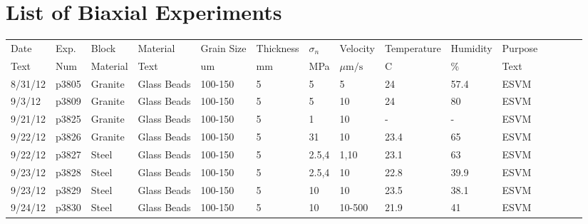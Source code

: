 \chapter{List of Biaxial Experiments}

\setlength\LTleft{0pt}
\setlength\LTright{0pt}
\begin{landscape}
\tiny
\begin{longtable} {lllllllllllllll}
Date     & Exp. & Block            & Material     & Grain Size   & Thickness & $\sigma_n$ & Velocity                     & Temperature & Humidity & Purpose\\
Text     & Num        & Material         & Text         & um           & mm        & MPa           & $\mu\text{m/s}$                         & C           & \%       & Text \\
\hline
\hline
8/31/12  & p3805      & Granite          & Glass Beads  & 100-150      & 5         & 5             & 5                           & 24          & 57.4     & ESVM\\
9/3/12   & p3809      & Granite          & Glass Beads  & 100-150      & 5         & 5             & 10                           & 24          & 80       & ESVM\\
9/21/12  & p3825      & Granite          & Glass Beads  & 100-150      & 5         & 1             & 10                           & -           & -        & ESVM\\
9/22/12  & p3826      & Granite          & Glass Beads  & 100-150      & 5         & 31            & 10                           & 23.4        & 65       & ESVM\\
9/22/12  & p3827      & Steel            & Glass Beads  & 100-150      & 5         & 2.5,4         & 1,10                      & 23.1        & 63       & ESVM\\
9/23/12  & p3828      & Steel            & Glass Beads  & 100-150      & 5         & 2.5,4         & 10                           & 22.8        & 39.9     & ESVM\\
9/23/12  & p3829      & Steel            & Glass Beads  & 100-150      & 5         & 10            & 10                           & 23.5        & 38.1     & ESVM\\
9/24/12  & p3830      & Steel            & Glass Beads  & 100-150      & 5         & 10            & 10-500 & 21.9        & 41       & ESVM\\

\end{longtable}
\end{landscape}
